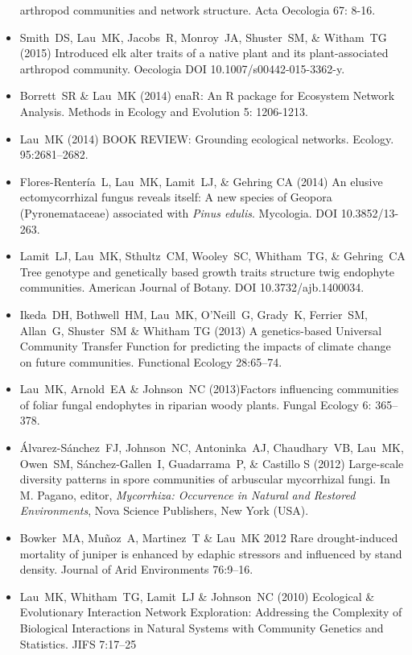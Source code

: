 \documentclass[a4paper]{article}
\begin{document}
\begin{itemize}
  arthropod communities and network structure. Acta Oecologia 67: 8-16. 
\item 
  Smith~DS, Lau~MK, Jacobs~R, Monroy~JA, Shuster~SM, \& Witham~TG (2015)
  Introduced elk alter traits of a native plant and its plant-associated
  arthropod community. Oecologia DOI 10.1007/s00442-015-3362-y.
\item
  Borrett~SR \& Lau~MK (2014) enaR: An R package for Ecosystem Network
  Analysis. Methods in Ecology and Evolution 5: 1206-1213.
\item
  Lau~MK (2014) BOOK REVIEW: Grounding ecological networks. Ecology.
  95:2681--2682.
\item
  Flores-Rentería~L, Lau~MK, Lamit~LJ, \& Gehring CA (2014) An elusive
  ectomycorrhizal fungus reveals itself: A new species of Geopora
  (Pyronemataceae) associated with \textit{Pinus edulis}. Mycologia. DOI
  10.3852/13-263.
\item
  Lamit~LJ, Lau~MK, Sthultz~CM, Wooley~SC, Whitham~TG, \& Gehring~CA
  Tree genotype and genetically based growth traits structure twig
  endophyte communities. American Journal of Botany. DOI 10.3732/ajb.1400034.
\item
  Ikeda~DH, Bothwell~HM, Lau~MK, O'Neill~G, Grady~K, Ferrier~SM,
  Allan~G, Shuster~SM \& Whitham TG (2013) A genetics-based Universal
  Community Transfer Function for predicting the impacts of climate
  change on future communities. Functional Ecology 28:65--74.
\item
  Lau~MK, Arnold~EA \& Johnson~NC (2013)Factors influencing communities
  of foliar fungal endophytes in riparian woody plants. Fungal Ecology
  6: 365--378.
\item
  Álvarez-Sánchez~FJ, Johnson~NC, Antoninka~AJ, Chaudhary~VB, Lau~MK,
  Owen~SM, Sánchez-Gallen~I, Guadarrama~P, \& Castillo S (2012)
  Large-scale diversity patterns in spore communities of arbuscular
  mycorrhizal fungi. In M. Pagano, editor, \emph{Mycorrhiza: Occurrence
  in Natural and Restored Environments}, Nova Science Publishers, New
  York (USA).
\item
  Bowker~MA, Muñoz~A, Martinez~T \& Lau~MK 2012 Rare drought-induced
  mortality of juniper is enhanced by edaphic stressors and influenced
  by stand density. Journal of Arid Environments 76:9--16.
\item
  Lau~MK, Whitham~TG, Lamit~LJ \& Johnson~NC (2010) Ecological \&
  Evolutionary Interaction Network Exploration: Addressing the
  Complexity of Biological Interactions in Natural Systems with
  Community Genetics and Statistics. JIFS 7:17--25

\end{itemize}
\end{document}
